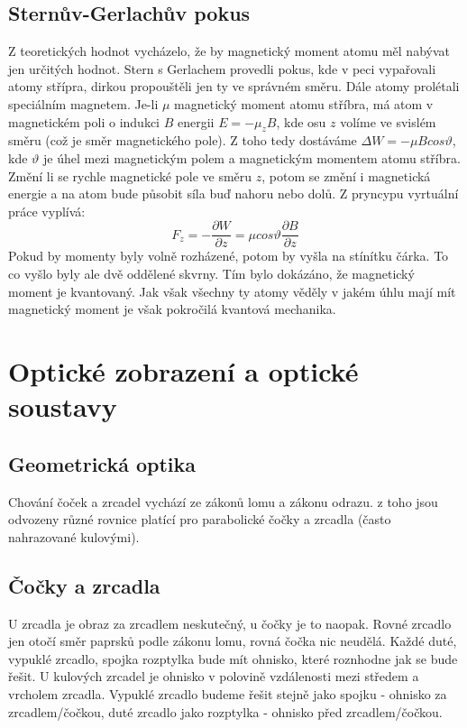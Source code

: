 \documentclass[titlepage]{report}
\begin{document}
\section{Sternův-Gerlachův pokus}
Z teoretických hodnot vycházelo, že by magnetický moment atomu měl nabývat jen určitých hodnot. Stern s Gerlachem provedli pokus, kde v peci vypařovali atomy střípra, dirkou propouštěli jen ty ve správném směru. Dále atomy prolétali speciálním magnetem. Je-li $\mu$ magnetický moment atomu stříbra, má atom v magnetickém poli o indukci $B$ energii $E = -\mu_z B$, kde osu $z$ volíme ve svislém směru (což je směr magnetického pole). Z toho tedy dostáváme $\Delta W = -\mu B cos \vartheta$, kde $\vartheta$ je úhel mezi magnetickým polem a magnetickým momentem atomu stříbra. Změní li se rychle magnetické pole ve směru $z$, potom se změní i magnetická energie a na atom bude působit síla buď nahoru nebo dolů. Z pryncypu vyrtuální práce vyplívá:\\
\begin{equation}
F_z = -\frac{\partial W}{\partial z} = \mu cos \vartheta \frac{\partial B}{\partial z}
\end{equation}
Pokud by momenty byly volně rozházené, potom by vyšla na stínítku čárka. To co vyšlo byly ale dvě oddělené skvrny. Tím bylo dokázáno, že magnetický moment je kvantovaný. Jak však všechny ty atomy věděly v jakém úhlu mají mít magnetický moment je však pokročilá kvantová mechanika.
\chapter{Optické zobrazení a optické soustavy}
\section{Geometrická optika}
Chování čoček a zrcadel vychází ze zákonů lomu a zákonu odrazu. z toho jsou odvozeny různé rovnice platící pro parabolické čočky a zrcadla (často nahrazované kulovými).
\section{Čočky a zrcadla}
U zrcadla je obraz za zrcadlem neskutečný, u čočky je to naopak. Rovné zrcadlo jen otočí směr paprsků podle zákonu lomu, rovná čočka nic neudělá. Každé duté, vypuklé zrcadlo, spojka rozptylka bude mít ohnisko, které roznhodne jak se bude řešit. U kulových zrcadel je ohnisko v polovině vzdálenosti mezi středem a vrcholem zrcadla. Vypuklé zrcadlo budeme řešit stejně jako spojku - ohnisko za zrcadlem/čočkou, duté zrcadlo jako rozptylka - ohnisko před zrcadlem/čočkou.
\end{document}
